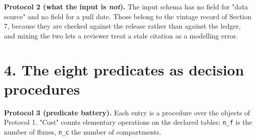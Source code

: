\documentclass[11pt]{article}
\begin{document}
\textbf{Protocol 2 (what the input is \emph{not}).} The input schema has no field for "data source" and no field for a pull date. Those belong to the vintage record of Section 7, because they are checked against the release rather than against the ledger, and mixing the two lets a reviewer treat a stale citation as a modelling error.

\vspace{0.8em}

\section*{4. The eight predicates as decision procedures}\label{4-the-eight-predicates-as-decision-procedures}

\textbf{Protocol 3 (predicate battery).} Each entry is a procedure over the objects of Protocol 1. "Cost" counts elementary operations on the declared tables; \texttt{n\_f} is the number of fluxes, \texttt{n\_c} the number of compartments.
\end{document}
